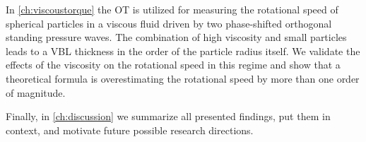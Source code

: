 In \cref{ch:viscoustorque} the OT is utilized for measuring the rotational 
speed of spherical particles in a viscous fluid driven by two phase-shifted 
orthogonal standing pressure waves. The combination of high viscosity and small 
particles leads to a VBL thickness in the order of the particle radius itself. 
We validate the effects of the viscosity on the rotational speed in this regime 
and show that a theoretical formula is overestimating the rotational speed by 
more than one order of magnitude.

Finally, in \cref{ch:discussion} we summarize all presented findings, put them 
in context, and motivate future possible research directions.
